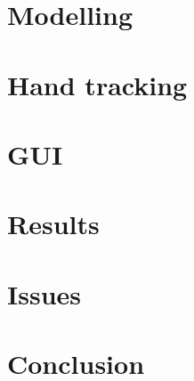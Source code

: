 \documentclass[conference]{IEEEtran}
\begin{document}
    \section{Modelling}\label{sec:modelling}
    

    \section{Hand tracking}\label{sec:hand_tracking}
    

    \section{GUI}\label{sec:gui}
    

    \section{Results}\label{sec:results}
    

    \section{Issues}\label{sec:issues}
    

    \section{Conclusion}\label{sec:conclusion}
    

    
\end{document}
